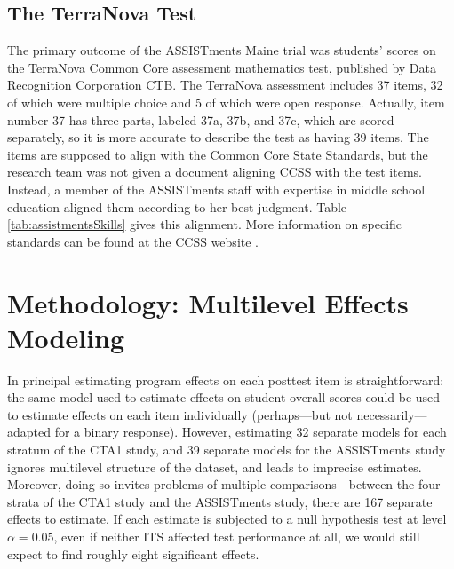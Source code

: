 \documentclass{edm_article}
\begin{document}
\subsection{The TerraNova Test}

The primary outcome of the ASSISTments Maine trial was students'
scores on the TerraNova Common Core assessment mathematics test,
published by Data Recognition Corporation CTB.
The TerraNova assessment includes 37 items, 32 of which were multiple
choice and 5 of which were open response.
Actually, item number 37 has three parts, labeled 37a, 37b, and 37c,
which are scored separately, so it is more accurate to describe the
test as having 39 items.
The items are supposed to align with the Common Core State Standards,
but the research team was not given a document aligning CCSS with the
test items.
Instead, a member of the ASSISTments staff with expertise in middle
school education aligned them according to her best judgment.
Table \ref{tab:assistmentsSkills} gives this alignment.
More information on specific standards can be found at the CCSS
website \cite{ccss}.



\section{Methodology: Multilevel Effects Modeling}\label{sec:method}
In principal estimating program effects on each posttest item is
straightforward: the same model used to estimate effects on student
overall scores could be used to estimate effects on each item
individually (perhaps---but not
necessarily---adapted for a binary response).
However, estimating 32 separate models for each stratum of the CTA1
study, and 39 separate models for the ASSISTments study ignores
multilevel structure of the dataset, and leads to imprecise estimates.
Moreover, doing so invites problems of multiple comparisons---between
the four strata of the CTA1 study and the ASSISTments study, there are
167 separate effects to estimate.
If each estimate is subjected to a null hypothesis test at level
$\alpha=0.05$, even if neither ITS affected test performance at all,
we would still expect to find roughly eight significant
effects.
\end{document}
